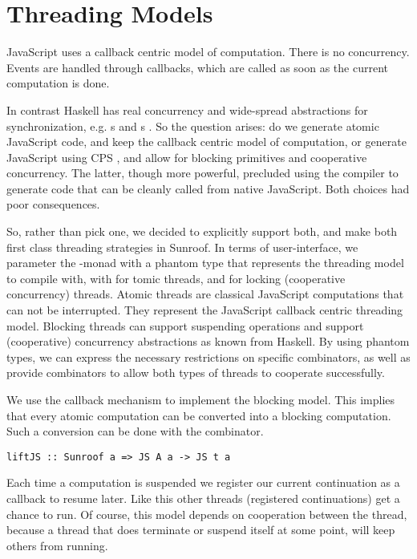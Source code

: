  
\section{Threading Models}
\label{sec:threading-models}

JavaScript uses a callback centric model of computation. There
is no concurrency. Events are handled through callbacks,
which are called as soon as the current computation is done.

In contrast Haskell has real concurrency and wide-spread 
abstractions for synchronization, e.g. s and s
.
So the question arises: do we generate atomic JavaScript code, 
and keep the callback centric model of computation, or generate JavaScript
using CPS \cite{Claessen:99:PoorMansConcurrencyMonad}, 
and allow for blocking primitives and
cooperative concurrency. The latter, though more powerful, 
precluded using the compiler to generate
code that can be cleanly called from native JavaScript.
Both choices had poor consequences.

So, rather than pick one, we decided to explicitly support both,
and make both first class threading strategies in Sunroof.
In terms of user-interface, we parameter the \JS-monad
with a phantom type that represents the threading model
to compile with, with  for tomic threads,
and  for locking (cooperative concurrency) threads. 
Atomic threads are classical JavaScript computations that
can not be interrupted. They represent the JavaScript callback
centric threading model. Blocking threads can
support suspending operations and support (cooperative) concurrency
abstractions as known from Haskell. By using phantom
types, we can express the necessary
restrictions on specific combinators, as well
as provide combinators to allow both types of
threads to cooperate successfully.

We use the callback mechanism to implement the blocking model.
This implies that every atomic computation can be converted into 
a blocking computation. Such a conversion can be done with the
 combinator.
\begin{verbatim}
liftJS :: Sunroof a => JS A a -> JS t a
\end{verbatim}
Each time a computation is suspended we register our current
continuation as a callback to resume later. Like this other 
threads (registered continuations) get a chance to run.
Of course, this model depends on cooperation between the thread,
because a thread that does terminate or suspend itself at some
point, will keep others from running.

